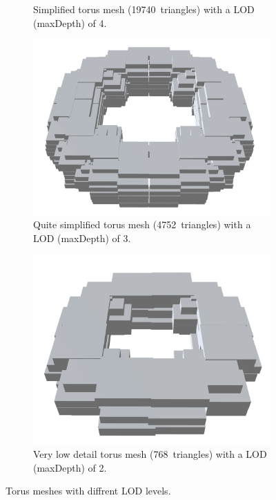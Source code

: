 \begin{figure}[htp]
\begin{subfigure}[t]{0.45\textwidth}
        \caption{Simplified torus mesh (19740~triangles) with a LOD (maxDepth) of 4.}
        \label{fig:torus-lod-4}
    \end{subfigure}
    \hfill
    \begin{subfigure}[t]{0.45\textwidth}
        \centering
        \includegraphics[width=\textwidth]{sections/result/figures/torus-lod-3.png}
        \caption{Quite simplified torus mesh (4752~triangles) with a LOD (maxDepth) of 3.}
        \label{fig:torus-lod-3}
    \end{subfigure}
    \hfill
    \begin{subfigure}[t]{0.45\textwidth}
        \centering
        \includegraphics[width=\textwidth]{sections/result/figures/torus-lod-2.png}
        \caption{Very low detail torus mesh (768~triangles) with a LOD (maxDepth) of 2.}
        \label{fig:torus-lod-2}
    \end{subfigure}
       \caption{Torus meshes with diffrent LOD levels.}
       \label{fig:torus-lod}
\end{figure}

